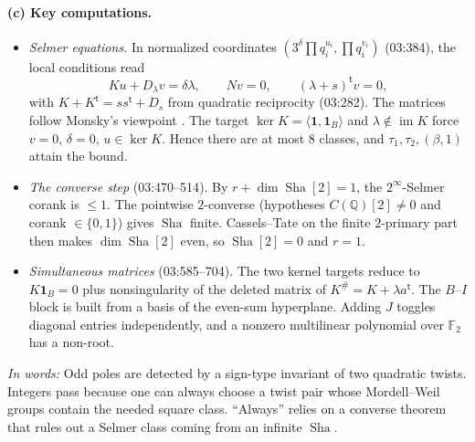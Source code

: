 \documentclass[11pt]{article}
\theoremstyle{definition}
\newcommand{\Q}{\mathbb Q}
\newcommand{\F}{\mathbb F}
\newcommand{\src}[1]{\textsf{#1}}
\newcommand{\inwords}[1]{\par\smallskip\noindent\emph{In words:} #1\par}
\DeclareMathOperator{\Sha}{Sha}
\begin{document}
\paragraph{(c) Key computations.}
\begin{itemize}
\item \emph{Selmer equations.}  In normalized coordinates
$(3^\delta\prod q_i^{u_i},\prod q_i^{v_i})$ (\src{03:384}), the local
conditions read
\[
 Ku+D_\lambda v=\delta\lambda,\qquad Nv=0,\qquad (\lambda+s)^{\mathsf t}v=0,
\]
with $K+K^{\mathsf t}=ss^{\mathsf t}+D_s$ from quadratic reciprocity
(\src{03:282}).  The matrices follow Monsky's viewpoint
\cite[Appendix]{HeathBrown1994}.  The target $\ker K=\langle\mathbf1,\mathbf1_B\rangle$ and
$\lambda\notin\operatorname{im}K$ force $v=0$, $\delta=0$,
$u\in\ker K$.  Hence there are at most $8$ classes, and
$\tau_1,\tau_2,(\beta,1)$ attain the bound.
\item \emph{The converse step} (\src{03:470--514}).  By
$r+\dim\Sha[2]=1$, the $2^\infty$-Selmer corank is $\le1$.  The pointwise
$2$-converse (hypotheses $C(\Q)[2]\ne0$ and corank $\in\{0,1\}$) gives
$\Sha$ finite.  Cassels--Tate on the finite $2$-primary part then makes
$\dim\Sha[2]$ even, so $\Sha[2]=0$ and $r=1$.
\item \emph{Simultaneous matrices} (\src{03:585--704}).  The two kernel
targets reduce to $K\mathbf1_B=0$ plus nonsingularity of the deleted
matrix of $K^\#=K+\lambda a^{\mathsf t}$.  The $B$--$I$ block is built from
a basis of the even-sum hyperplane.  Adding $J$ toggles diagonal entries
independently, and a nonzero multilinear polynomial over $\F_2$ has a
non-root.
\end{itemize}

\inwords{Odd poles are detected by a sign-type invariant of two quadratic
twists.  Integers pass because one can always choose a twist pair whose
Mordell--Weil groups contain the needed square class.  ``Always'' relies on
a converse theorem that rules out a Selmer class coming from an infinite
$\Sha$.}
\end{document}
